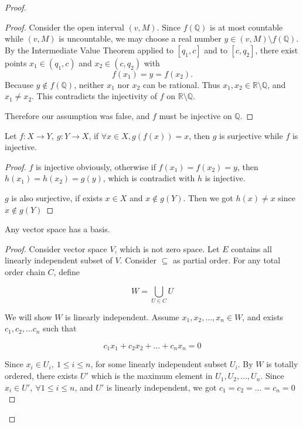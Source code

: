 \begin{proof}
\begin{proof}
Consider the open interval $(v,M)$. Since $f(\mathbb{Q})$ is at most countable while $(v,M)$
is uncountable, we may choose a real number $y\in(v,M)\setminus f(\mathbb{Q})$.
By the Intermediate Value Theorem applied to $[q_1,c]$ and to $[c,q_2]$, there exist points
$x_1\in(q_1,c)$ and $x_2\in(c,q_2)$ with
\[
f(x_1)=y=f(x_2).
\]
Because $y\notin f(\mathbb{Q})$, neither $x_1$ nor $x_2$ can be rational.
Thus $x_1,x_2\in\mathbb{R}\setminus\mathbb{Q}$, and $x_1\neq x_2$.
This contradicts the injectivity of $f$ on $\mathbb{R}\setminus\mathbb{Q}$.

Therefore our assumption was false, and $f$ must be injective on $\mathbb{Q}$.
\end{proof}

\begin{exercise}
    Let $f: X \to Y,\: g: Y \to X$, if $\forall x \in X, g(f(x)) = x$, then $g$ is surjective 
    while $f$ is injective.
\end{exercise}

\begin{proof}
   $f$ is injective obviously, otherwise if $f(x_1) = f(x_2) = y$, then $h(x_1) = h(x_2) = g(y)$, which is contradict with
   $h$ is injective.

   $g$ is also surjective, if exists $x \in X$ and $x \notin g(Y)$. Then we got $h(x) \ne x$ since $x \notin g(Y)$
\end{proof}

\begin{exercise}
    Any vector space has a basis.
\end{exercise}

\begin{proof}
   Consider vector space $V$, which is not zero space. Let $E$ contains  
   all linearly independent subset of $V$. Consider $\subseteq$ as partial order.
   For any total order chain $C$, define 

   \[
        W = \bigcup_{U \in C} U
   \]

   We will show $W$ is linearly independent. Assume $x_1, x_2, \dots, x_n \in W$, and exists $c_1,c_2,\dots c_n$ such that

   \[
    c_1x_1 + c_2 x_2 + \dots + c_n x_n = 0
   \]

    Since $x_i \in U_i,\: 1 \le i \le n$, for some linearly independent subset $U_i$. 
    By $W$ is totally ordered, there exists $U'$ which is the 
    maximum element in $U_1,U_2,\dots ,U_n$. Since $x_i \in U', \: \forall 1 \le i \le n$, 
    and $U'$ is linearly independent, we got $c_1 = c_2 = \dots = c_n = 0$


\end{proof}
\end{proof}
